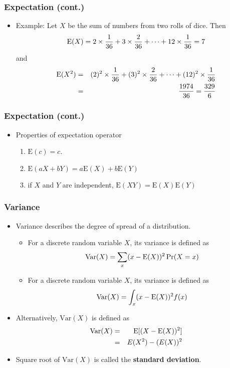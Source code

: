 \documentclass[pdflatex, 12pt]{beamer}
\begin{document}
\begin{frame}
\frametitle{Expectation (cont.)}
\begin{itemize}
\item Example: Let $X$ be the sum of numbers from two rolls of dice. Then
 \begin{equation}
 \mathrm{E}(X) = 2 \times \frac{1}{36} + 3 \times \frac{2}{36} + \cdots + 12 \times \frac{1}{36} = 7 \notag
 \end{equation}
 and 
 \begin{eqnarray}
 \mathrm{E}(X^2) &=& (2)^2 \times \frac{1}{36} + (3)^2 \times \frac{2}{36} + \cdots + (12)^2 \times \frac{1}{36} \notag \\
 &=& \frac{1974}{36} = \frac{329}{6} \notag
 \end{eqnarray}
\end{itemize}
\end{frame}

\begin{frame}
\frametitle{Expectation (cont.)}
\begin{itemize}
\item Properties of expectation operator
 \begin{enumerate}
 \item $\mathrm{E}(c) = c$.
 \item $\mathrm{E}(aX + bY) = a\mathrm{E}(X) + b\mathrm{E}(Y)$
 \item if $X$ and $Y$ are independent, $\mathrm{E}(XY) = \mathrm{E}(X)\mathrm{E}(Y)$
 \end{enumerate}
\end{itemize}
\end{frame}

\begin{frame}
\frametitle{Variance}
\begin{itemize}
\item Variance describes the degree of spread of a distribution.
 \begin{itemize}
 \item For a discrete random variable $X$, its variance is defined as
  \begin{equation}
  \mathrm{Var}(X) = \sum_{x} (x - \mathrm{E}(X))^2 \Pr(X = x) \notag
  \end{equation}
 \item For a discrete random variable $X$, its variance is defined as
  \begin{equation}
  \mathrm{Var}(X) = \int_{x} (x - \mathrm{E}(X))^2 f(x) \notag
  \end{equation}
 \end{itemize}
\vspace{0.2cm}
\item Alternatively, $\mathrm{Var}(X)$ is defined as 
 \begin{eqnarray}
 \mathrm{Var}(X) &=& \mathrm{E}[(X - \mathrm{E}(X))^2] \notag \\
 &=& E(X^2) - (E(X))^2
 \end{eqnarray}
\item Square root of $\mathrm{Var}(X)$ is called the \textbf{standard deviation}.
\end{itemize}
\end{frame}
\end{document}
